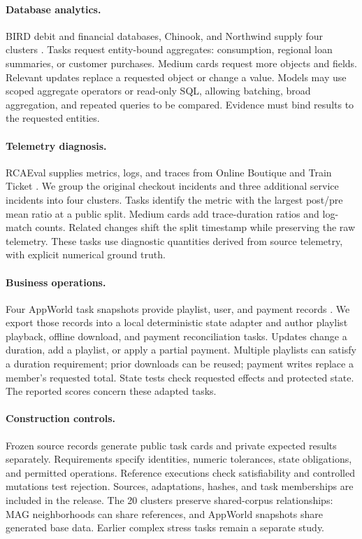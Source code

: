 \documentclass[11pt]{article}
\begin{document}
\paragraph{Database analytics.}
BIRD debit and financial databases, Chinook, and Northwind supply four clusters \citep{bird,birdminidev,chinook,northwind}. Tasks request entity-bound aggregates: consumption, regional loan summaries, or customer purchases. Medium cards request more objects and fields. Relevant updates replace a requested object or change a value. Models may use scoped aggregate operators or read-only SQL, allowing batching, broad aggregation, and repeated queries to be compared. Evidence must bind results to the requested entities.

\paragraph{Telemetry diagnosis.}
RCAEval supplies metrics, logs, and traces from Online Boutique and Train Ticket \citep{rcaeval}. We group the original checkout incidents and three additional service incidents into four clusters. Tasks identify the metric with the largest post/pre mean ratio at a public split. Medium cards add trace-duration ratios and log-match counts. Related changes shift the split timestamp while preserving the raw telemetry. These tasks use diagnostic quantities derived from source telemetry, with explicit numerical ground truth.

\paragraph{Business operations.}
Four AppWorld task snapshots provide playlist, user, and payment records \citep{trivedi2024appworld}. We export those records into a local deterministic state adapter and author playlist playback, offline download, and payment reconciliation tasks. Updates change a duration, add a playlist, or apply a partial payment. Multiple playlists can satisfy a duration requirement; prior downloads can be reused; payment writes replace a member's requested total. State tests check requested effects and protected state. The reported scores concern these adapted tasks.

\paragraph{Construction controls.}
Frozen source records generate public task cards and private expected results separately. Requirements specify identities, numeric tolerances, state obligations, and permitted operations. Reference executions check satisfiability and controlled mutations test rejection. Sources, adaptations, hashes, and task memberships are included in the release. The 20 clusters preserve shared-corpus relationships: MAG neighborhoods can share references, and AppWorld snapshots share generated base data. Earlier complex stress tasks remain a separate study.
\end{document}
